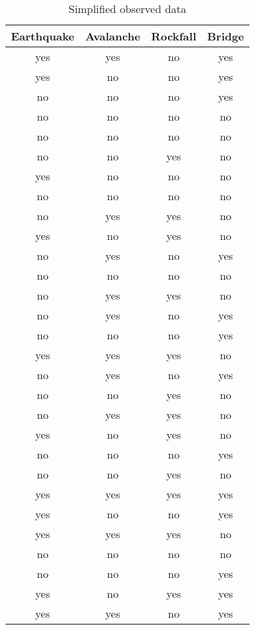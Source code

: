 \begin{table}
	\centering
	\caption{Simplified observed data} \label{tblbayes4a}
\begin{tabular}{|c|c|c|c|}
\hline
Earthquake & Avalanche & Rockfall & Bridge \\ 
\hline
yes & yes & no & yes \\ 
\hline
yes & no & no & yes \\ 
\hline
no & no & no & yes \\ 
\hline
no & no & no & no \\ 
\hline
no & no & no & no \\ 
\hline
no & no & yes & no \\ 
\hline
yes & no & no & no \\ 
\hline
no & no & no & no \\ 
\hline
no & yes & yes & no \\ 
\hline
yes & no & yes & no \\ 
\hline
no & yes & no & yes \\ 
\hline
no & no & no & no \\ 
\hline
no & yes & yes & no \\ 
\hline
no & yes & no & yes \\ 
\hline
no & no & no & yes \\ 
\hline
yes & yes & yes & no \\ 
\hline
no & yes & no & yes \\ 
\hline
no & no & yes & no \\ 
\hline
no & yes & yes & no \\ 
\hline
yes & no & yes & no \\ 
\hline
no & no & no & yes \\ 
\hline
no & no & yes & no \\ 
\hline
yes & yes & yes & yes \\ 
\hline
yes & no & no & yes \\ 
\hline
yes & yes & yes & no \\ 
\hline
no & no & no & no \\ 
\hline
no & no & no & yes \\ 
\hline
yes & no & yes & yes \\ 
\hline
yes & yes & no & yes \\ 
\hline
\end{tabular}
\end{table}


